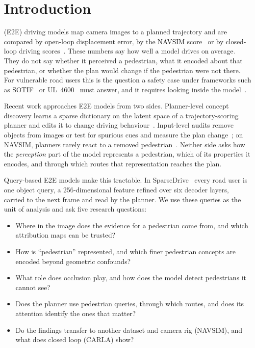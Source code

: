 \documentclass[journal]{IEEEtran}
\newcommand{\RQ}[1]{\textbf{RQ#1}}
\begin{document}
\section{Introduction}
 (E2E) driving models map camera images to a planned trajectory and are compared by
open-loop displacement error, by the NAVSIM score~\cite{dauner2024navsim} or by closed-loop driving
scores~\cite{jia2024bench2drive}. These numbers say how well a model drives on average. They do not say whether it
perceived a pedestrian, what it encoded about that pedestrian, or whether the plan would change if the pedestrian were
not there. For vulnerable road users this is the question a safety case under frameworks such as
SOTIF~\cite{iso21448} or UL~4600~\cite{ul4600} must answer, and it requires looking inside the
model~\cite{kuznietsov2024xaireview,atakishiyev2025safety}.

Recent work approaches E2E models from two sides. Planner-level concept discovery learns a sparse dictionary on the
latent space of a trajectory-scoring planner and edits it to change driving behaviour~\cite{motzkus2026drivingwrongway}.
Input-level audits remove objects from images or test for spurious cues and measure the plan
change~\cite{yang2026beyondleaderboard,cvaa2026,cadet2026}; on NAVSIM, planners rarely react to a removed
pedestrian~\cite{yang2026beyondleaderboard}. Neither side asks how the \emph{perception} part of the model represents a
pedestrian, which of its properties it encodes, and through which routes that representation reaches the plan.

Query-based E2E models make this tractable. In SparseDrive~\cite{sun2024sparsedrive} every road user is one object
query, a 256-dimensional feature refined over six decoder layers, carried to the next frame and read by the planner.
We use these queries as the unit of analysis and ask five research questions:
\begin{itemize}
\item[\RQ1] Where in the image does the evidence for a pedestrian come from, and which attribution maps can be trusted?
\item[\RQ2] How is ``pedestrian'' represented, and which finer pedestrian concepts are encoded beyond geometric confounds?
\item[\RQ3] What role does occlusion play, and how does the model detect pedestrians it cannot see?
\item[\RQ4] Does the planner use pedestrian queries, through which routes, and does its attention identify the ones that matter?
\item[\RQ5] Do the findings transfer to another dataset and camera rig (NAVSIM), and what does closed loop (CARLA) show?
\end{itemize}
\end{document}
